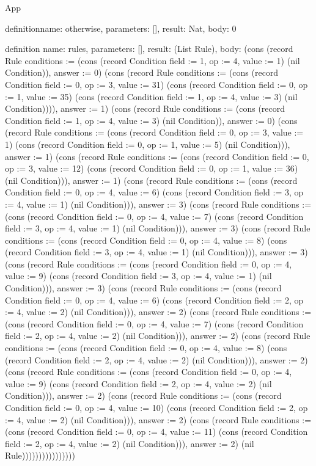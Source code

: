 \begin{lexlean}{App}
\begin{semanticmodule}
definition{name: otherwise, parameters: [], result: Nat, body: 0}

definition{
  name: rules,
  parameters: [],
  result: (List Rule),
  body: (cons (record Rule {conditions := (cons (record Condition {field := 1, op := 4, value := 1}) (nil Condition)), answer := 0}) (cons (record Rule {conditions := (cons (record Condition {field := 0, op := 3, value := 31}) (cons (record Condition {field := 0, op := 1, value := 35}) (cons (record Condition {field := 1, op := 4, value := 3}) (nil Condition)))), answer := 1}) (cons (record Rule {conditions := (cons (record Condition {field := 1, op := 4, value := 3}) (nil Condition)), answer := 0}) (cons (record Rule {conditions := (cons (record Condition {field := 0, op := 3, value := 1}) (cons (record Condition {field := 0, op := 1, value := 5}) (nil Condition))), answer := 1}) (cons (record Rule {conditions := (cons (record Condition {field := 0, op := 3, value := 12}) (cons (record Condition {field := 0, op := 1, value := 36}) (nil Condition))), answer := 1}) (cons (record Rule {conditions := (cons (record Condition {field := 0, op := 4, value := 6}) (cons (record Condition {field := 3, op := 4, value := 1}) (nil Condition))), answer := 3}) (cons (record Rule {conditions := (cons (record Condition {field := 0, op := 4, value := 7}) (cons (record Condition {field := 3, op := 4, value := 1}) (nil Condition))), answer := 3}) (cons (record Rule {conditions := (cons (record Condition {field := 0, op := 4, value := 8}) (cons (record Condition {field := 3, op := 4, value := 1}) (nil Condition))), answer := 3}) (cons (record Rule {conditions := (cons (record Condition {field := 0, op := 4, value := 9}) (cons (record Condition {field := 3, op := 4, value := 1}) (nil Condition))), answer := 3}) (cons (record Rule {conditions := (cons (record Condition {field := 0, op := 4, value := 6}) (cons (record Condition {field := 2, op := 4, value := 2}) (nil Condition))), answer := 2}) (cons (record Rule {conditions := (cons (record Condition {field := 0, op := 4, value := 7}) (cons (record Condition {field := 2, op := 4, value := 2}) (nil Condition))), answer := 2}) (cons (record Rule {conditions := (cons (record Condition {field := 0, op := 4, value := 8}) (cons (record Condition {field := 2, op := 4, value := 2}) (nil Condition))), answer := 2}) (cons (record Rule {conditions := (cons (record Condition {field := 0, op := 4, value := 9}) (cons (record Condition {field := 2, op := 4, value := 2}) (nil Condition))), answer := 2}) (cons (record Rule {conditions := (cons (record Condition {field := 0, op := 4, value := 10}) (cons (record Condition {field := 2, op := 4, value := 2}) (nil Condition))), answer := 2}) (cons (record Rule {conditions := (cons (record Condition {field := 0, op := 4, value := 11}) (cons (record Condition {field := 2, op := 4, value := 2}) (nil Condition))), answer := 2}) (nil Rule))))))))))))))))
}


\end{semanticmodule}
\end{lexlean}
